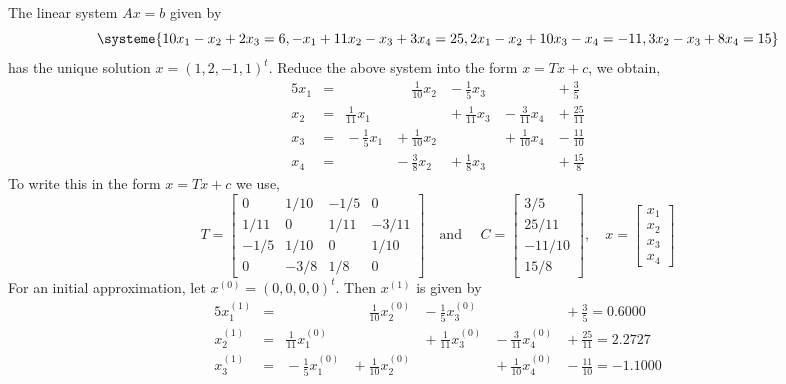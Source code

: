 \documentclass[../main-sheet.tex]{subfiles}
\begin{document}
\begin{ex}
    The linear system \(Ax=b\) given by
    \[\systeme{
        10x_1-x_2+2x_3=6,
        -x_1+11x_2-x_3+3x_4=25,
        2x_1-x_2+10x_3-x_4=-11,
        3x_2-x_3+8x_4=15
    }\]
    has the unique solution \(x=(1,2,-1,1)^t\). Reduce the above system into the form \(x=Tx+c\), we obtain,
    \begin{alignat*}{5}
        x_1 & {}={} &  & \phantom{+} \frac{1}{10}x_2 & {}-{} \frac{1}{5}x_3 & & {}+{} \frac{3}{5}\\
        x_2 & {}={} & \frac{1}{11}x_1 & & {}+{} \frac{1}{11}x_3& {}-{} \frac{3}{11}x_4 & {}+{} \frac{25}{11}\\
        x_3 & {}={} & {}-{} \frac{1}{5}x_1 & {}+{} \frac{1}{10}x_2 & & {}+{} \frac{1}{10}x_4 & {}-{} \frac{11}{10}\\
        x_4 & {}={} & & {}-{} \frac{3}{8}x_2 & {}+{} \frac{1}{8}x_3 & & {}+{} \frac{15}{8}
    \end{alignat*}
    To write this in the form \(x=Tx+c\) we use,
    \[T=\begin{bmatrix}
        0 & 1/10 & -1/5& 0\\
        1/11 & 0 & 1/11& -3/11\\
        -1/5 & 1/10 & 0& 1/10\\
        0 & -3/8 & 1/8& 0
    \end{bmatrix}\quad \text{and }\quad C=\begin{bmatrix}
        3/5\\25/11\\-11/10\\15/8
    \end{bmatrix},\quad x=\begin{bmatrix}
        x_1\\x_2\\x_3\\x_4
    \end{bmatrix}\]
    For an initial approximation, let \(x^{(0)}=(0,0,0,0)^t\). Then \(x^{(1)}\) is given by
    \begin{alignat*}{5}
        x_1^{(1)} & {}={} &  & \phantom{+} \frac{1}{10}x_2^{(0)} & {}-{} \frac{1}{5}x_3^{(0)} & & {}+{} \frac{3}{5}=0.6000\\
        x_2^{(1)} & {}={} & \frac{1}{11}x_1^{(0)} & & {}+{} \frac{1}{11}x_3^{(0)}& {}-{} \frac{3}{11}x_4^{(0)} & {}+{} \frac{25}{11}=2.2727\\
        x_3^{(1)} & {}={} & {}-{} \frac{1}{5}x_1^{(0)} & {}+{} \frac{1}{10}x_2^{(0)} & & {}+{} \frac{1}{10}x_4^{(0)} & {}-{} \frac{11}{10}=-1.1000\\

\end{alignat*}
\end{ex}
\end{document}
